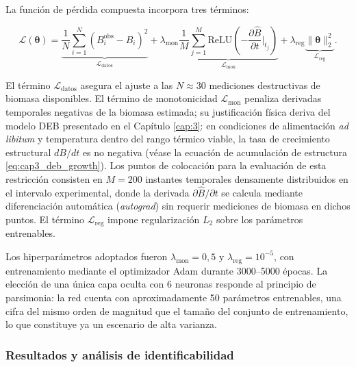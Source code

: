 La función de pérdida compuesta incorpora tres términos:

\begin{equation}
\mathcal{L}(\boldsymbol{\theta}) = 
\underbrace{\frac{1}{N}\sum_{i=1}^{N}\left(B_i^{\mathrm{obs}}-\hat{B}_i\right)^2}_{\mathcal{L}_{\mathrm{datos}}}
+ \lambda_{\mathrm{mon}}\underbrace{\frac{1}{M}\sum_{j=1}^{M}\mathrm{ReLU}\!\left(-\frac{\partial \hat{B}}{\partial t}\bigg|_{t_j}\right)}_{\mathcal{L}_{\mathrm{mon}}}
+ \lambda_{\mathrm{reg}}\underbrace{\|\boldsymbol{\theta}\|_2^2}_{\mathcal{L}_{\mathrm{reg}}}.
\label{eq:cap4_pi_rna_perdida}
\end{equation}

El término $\mathcal{L}_{\mathrm{datos}}$ asegura el ajuste a las $N\approx 30$ mediciones destructivas de biomasa disponibles. El término de monotonicidad $\mathcal{L}_{\mathrm{mon}}$ penaliza derivadas temporales negativas de la biomasa estimada; su justificación física deriva del modelo DEB presentado en el Capítulo \ref{cap:3}: en condiciones de alimentación \textit{ad libitum} y temperatura dentro del rango térmico viable, la tasa de crecimiento estructural $dB/dt$ es no negativa (véase la ecuación de acumulación de estructura \eqref{eq:cap3_deb_growth}). Los puntos de colocación para la evaluación de esta restricción consisten en $M=200$ instantes temporales densamente distribuidos en el intervalo experimental, donde la derivada $\partial \hat{B}/\partial t$ se calcula mediante diferenciación automática (\textit{autograd}) sin requerir mediciones de biomasa en dichos puntos. El término $\mathcal{L}_{\mathrm{reg}}$ impone regularización $L_2$ sobre los parámetros entrenables.

Los hiperparámetros adoptados fueron $\lambda_{\mathrm{mon}}=0{,}5$ y $\lambda_{\mathrm{reg}}=10^{-5}$, con entrenamiento mediante el optimizador Adam durante 3000--5000 épocas. La elección de una única capa oculta con 6 neuronas responde al principio de parsimonia: la red cuenta con aproximadamente 50 parámetros entrenables, una cifra del mismo orden de magnitud que el tamaño del conjunto de entrenamiento, lo que constituye ya un escenario de alta varianza.

\subsubsection*{Resultados y análisis de identificabilidad}

